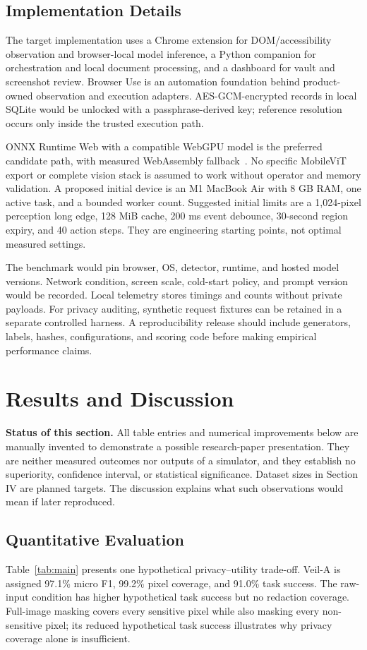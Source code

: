 \documentclass[conference]{IEEEtran}
\begin{document}
\subsection{Implementation Details}
The target implementation uses a Chrome extension for DOM/accessibility observation and browser-local model inference, a Python companion for orchestration and local document processing, and a dashboard for vault and screenshot review. Browser Use is an automation foundation behind product-owned observation and execution adapters. AES-GCM-encrypted records in local SQLite would be unlocked with a passphrase-derived key; reference resolution occurs only inside the trusted execution path.

ONNX Runtime Web with a compatible WebGPU model is the preferred candidate path, with measured WebAssembly fallback~\cite{ort}. No specific MobileViT export or complete vision stack is assumed to work without operator and memory validation. A proposed initial device is an M1 MacBook Air with 8 GB RAM, one active task, and a bounded worker count. Suggested initial limits are a 1,024-pixel perception long edge, 128 MiB cache, 200 ms event debounce, 30-second region expiry, and 40 action steps. They are engineering starting points, not optimal measured settings.

The benchmark would pin browser, OS, detector, runtime, and hosted model versions. Network condition, screen scale, cold-start policy, and prompt version would be recorded. Local telemetry stores timings and counts without private payloads. For privacy auditing, synthetic request fixtures can be retained in a separate controlled harness. A reproducibility release should include generators, labels, hashes, configurations, and scoring code before making empirical performance claims.

\section{Results and Discussion}
\textbf{Status of this section.} All table entries and numerical improvements below are manually invented to demonstrate a possible research-paper presentation. They are neither measured outcomes nor outputs of a simulator, and they establish no superiority, confidence interval, or statistical significance. Dataset sizes in Section IV are planned targets. The discussion explains what such observations would mean if later reproduced.

\subsection{Quantitative Evaluation}
Table~\ref{tab:main} presents one hypothetical privacy--utility trade-off. Veil-A is assigned 97.1\% micro F1, 99.2\% pixel coverage, and 91.0\% task success. The raw-input condition has higher hypothetical task success but no redaction coverage. Full-image masking covers every sensitive pixel while also masking every non-sensitive pixel; its reduced hypothetical task success illustrates why privacy coverage alone is insufficient.
\end{document}
